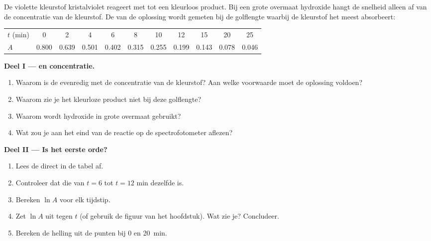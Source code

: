 \begin{problem}
\label{pb:g12:reaction-rates:1}
De violette kleurstof kristalviolet reageert met  tot een
kleurloos product. Bij een grote overmaat hydroxide hangt de snelheid
alleen af van de concentratie van de kleurstof. De  van de
oplossing wordt gemeten bij de golflengte waarbij de kleurstof het meest
absorbeert:
\begin{center}
\small
\begin{tabular}{l*{10}{c}}
\hline
$t$ (\si{min}) & 0 & 2 & 4 & 6 & 8 & 10 & 12 & 15 & 20 & 25 \\
$A$ & 0.800 & 0.639 & 0.501 & 0.402 & 0.315 & 0.255 & 0.199 & 0.143 &
0.078 & 0.046 \\
\hline
\end{tabular}
\end{center}

\medskip
\noindent\textbf{Deel I ---  en concentratie.}
\begin{enumerate}
  \item Waarom is de  evenredig met de concentratie van de
        kleurstof? Aan welke voorwaarde moet de oplossing voldoen?
  \item Waarom zie je het kleurloze product niet bij deze golflengte?
  \item Waarom wordt hydroxide in grote overmaat gebruikt?
  \item Wat zou je aan het eind van de reactie op de spectrofotometer
        aflezen?
\end{enumerate}

\medskip
\noindent\textbf{Deel II --- Is het eerste orde?}
\begin{enumerate}[resume]
  \item Lees de  direct in de tabel af.
  \item Controleer dat die van $t = 6$ tot $t = 12$ min dezelfde is.
  \item Bereken $\ln A$ voor elk tijdstip.
  \item Zet $\ln A$ uit tegen $t$ (of gebruik de figuur van het
        hoofdstuk). Wat zie je? Concludeer.
  \item Bereken de helling uit de punten bij 0 en \qty{20}{min}.
\end{enumerate}


\end{problem}
